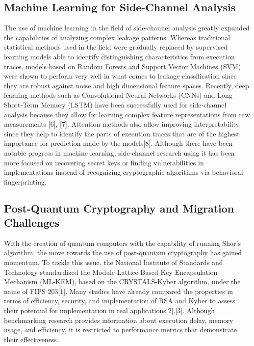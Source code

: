 \documentclass[conference]{IEEEtran}
\begin{document}
\subsection{Machine Learning for Side-Channel Analysis}

The use of machine learning in the field of side-channel analysis greatly expanded the capabilities of analyzing complex leakage patterns. Whereas traditional statistical methods used in the field were gradually replaced by supervised learning models able to identify distinguishing characteristics from execution traces, models based on Random Forests and Support Vector Machines (SVM) were shown to perform very well in what comes to leakage classification since they are robust against noise and high dimensional feature spaces. Recently, deep learning methods such as Convolutional Neural Networks (CNNs) and Long Short-Term Memory (LSTM) have been successfully used for side-channel analysis because they allow for learning complex feature representations from raw measurements [6], [7]. Attention methods also allow improving interpretability since they help to identify the parts of execution traces that are of the highest importance for prediction made by the models[8]. Although there have been notable progress in machine learning, side-channel research using it has been more focused on recovering secret keys or finding vulnerabilities in implementations instead of recognizing cryptographic algorithms via behavioral fingerprinting.

\subsection{Post-Quantum Cryptography and Migration Challenges}

With the creation of quantum computers with the capability of running Shor’s algorithm, the move towards the use of post-quantum cryptography has gained momentum. To tackle this issue, the National Institute of Standards and Technology standardized the Module-Lattice-Based Key Encapsulation Mechanism (ML-KEM), based on the CRYSTALS-Kyber algorithm, under the name of FIPS 203[1]. Many studies have already compared the properties in terms of efficiency, security, and implementation of RSA and Kyber to assess their potential for implementation in real applications[2],[3]. Although benchmarking research provides information about execution delay, memory usage, and efficiency, it is restricted to performance metrics that demonstrate their effectiveness.
\end{document}

